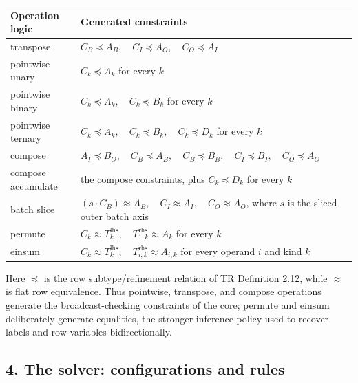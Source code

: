 \documentclass[
  10pt,
  letterpaper,
]{article}
\begin{document}
\begin{longtable}[]{@{}
  >{\raggedright\arraybackslash}p{}
  >{\raggedright\arraybackslash}p{}@{}}
\toprule\noalign{}
\begin{minipage}[b]{\linewidth}\raggedright
Operation logic
\end{minipage} & \begin{minipage}[b]{\linewidth}\raggedright
Generated constraints
\end{minipage} \\
\midrule\noalign{}
\endhead
\bottomrule\noalign{}
\endlastfoot
transpose &
\(C_B \preceq A_B,\quad C_I \preceq A_O,\quad C_O \preceq A_I\) \\
pointwise unary & \(C_k \preceq A_k\) for every \(k\) \\
pointwise binary & \(C_k \preceq A_k,\quad C_k \preceq B_k\) for every
\(k\) \\
pointwise ternary &
\(C_k \preceq A_k,\quad C_k \preceq B_k,\quad C_k \preceq D_k\) for
every \(k\) \\
compose &
\(A_I \preceq B_O,\quad C_B \preceq A_B,\quad C_B \preceq B_B,\quad C_I \preceq B_I,\quad C_O \preceq A_O\) \\
compose accumulate & the compose constraints, plus \(C_k \preceq D_k\)
for every \(k\) \\
batch slice &
\((s \cdot C_B) \approx A_B,\quad C_I \approx A_I,\quad C_O \approx A_O\),
where \(s\) is the sliced outer batch axis \\
permute &
\(C_k \approx T^{\mathrm{lhs}}_k,\quad T^{\mathrm{rhs}}_{1,k} \approx A_k\)
for every \(k\) \\
einsum &
\(C_k \approx T^{\mathrm{lhs}}_k,\quad T^{\mathrm{rhs}}_{i,k} \approx A_{i,k}\)
for every operand \(i\) and kind \(k\) \\
\end{longtable}

Here \(\preceq\) is the row subtype/refinement relation of TR Definition
2.12, while \(\approx\) is flat row equivalence. Thus pointwise,
transpose, and compose operations generate the broadcast-checking
constraints of the core; permute and einsum deliberately generate
equalities, the stronger inference policy used to recover labels and row
variables bidirectionally.

\subsection{4. The solver: configurations and
rules}\label{the-solver-configurations-and-rules}
\end{document}
